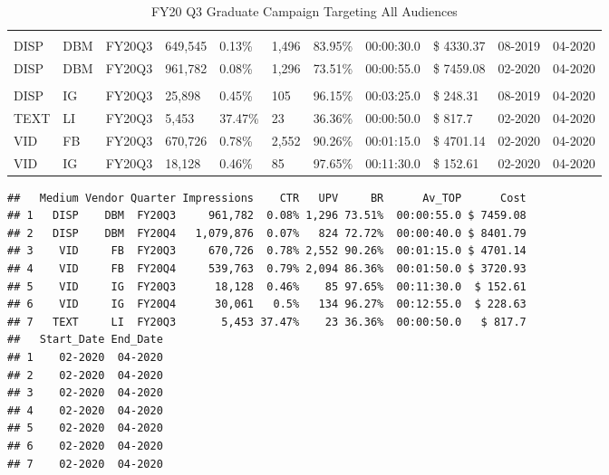 \documentclass[
  11pt,
]{article}
\begin{document}
\begin{landscape}\begin{table}

\caption{\label{tab:unnamed-chunk-5}FY20 Q3 Graduate Campaign Targeting All Audiences}
\centering
\begin{tabu} to 
\toprule
{} &  &  &  &  &  &  &  &  &  & \\
\midrule
\addlinespace[0.3em]
\\
\hspace{1em}DISP & DBM & FY20Q3 & 649,545 & 0.13\% & 1,496 & 83.95\% & 00:00:30.0 & \$ 4330.37 & 08-2019 & 04-2020\\
\hspace{1em}DISP & DBM & FY20Q3 & 961,782 & 0.08\% & 1,296 & 73.51\% & 00:00:55.0 & \$ 7459.08 & 02-2020 & 04-2020\\
\addlinespace[0.3em]
\\
\hspace{1em}DISP & IG & FY20Q3 & 25,898 & 0.45\% & 105 & 96.15\% & 00:03:25.0 & \$ 248.31 & 08-2019 & 04-2020\\
\hspace{1em}TEXT & LI & FY20Q3 & 5,453 & 37.47\% & 23 & 36.36\% & 00:00:50.0 & \$ 817.7 & 02-2020 & 04-2020\\
VID & FB & FY20Q3 & 670,726 & 0.78\% & 2,552 & 90.26\% & 00:01:15.0 & \$ 4701.14 & 02-2020 & 04-2020\\
VID & IG & FY20Q3 & 18,128 & 0.46\% & 85 & 97.65\% & 00:11:30.0 & \$ 152.61 & 02-2020 & 04-2020\\
\bottomrule
\end{tabu}
\end{table}
\end{landscape}

\begin{verbatim}
##   Medium Vendor Quarter Impressions    CTR   UPV     BR      Av_TOP      Cost
## 1   DISP    DBM  FY20Q3     961,782  0.08% 1,296 73.51%  00:00:55.0 $ 7459.08
## 2   DISP    DBM  FY20Q4   1,079,876  0.07%   824 72.72%  00:00:40.0 $ 8401.79
## 3    VID     FB  FY20Q3     670,726  0.78% 2,552 90.26%  00:01:15.0 $ 4701.14
## 4    VID     FB  FY20Q4     539,763  0.79% 2,094 86.36%  00:01:50.0 $ 3720.93
## 5    VID     IG  FY20Q3      18,128  0.46%    85 97.65%  00:11:30.0  $ 152.61
## 6    VID     IG  FY20Q4      30,061   0.5%   134 96.27%  00:12:55.0  $ 228.63
## 7   TEXT     LI  FY20Q3       5,453 37.47%    23 36.36%  00:00:50.0   $ 817.7
##   Start_Date End_Date
## 1    02-2020  04-2020
## 2    02-2020  04-2020
## 3    02-2020  04-2020
## 4    02-2020  04-2020
## 5    02-2020  04-2020
## 6    02-2020  04-2020
## 7    02-2020  04-2020
\end{verbatim}
\end{document}
